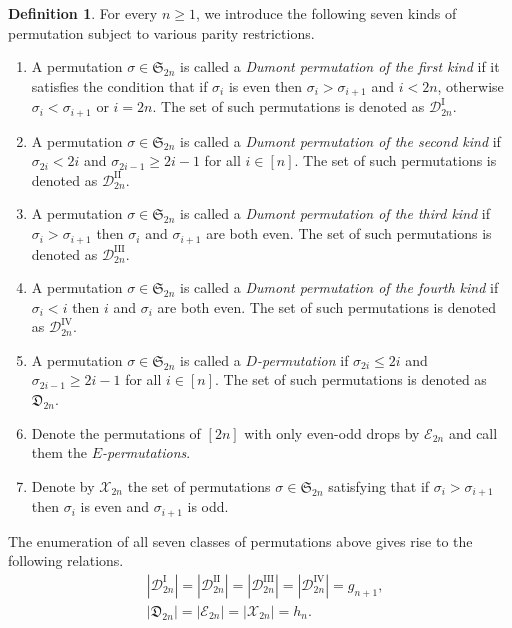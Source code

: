 \documentclass[11pt,reqno]{amsart}
\numberwithin{equation}{section}
\theoremstyle{plain}
\theoremstyle{definition}
\newtheorem{Def}[theorem]{Definition}
\newcommand{\D}{\mathcal{D}}
\newcommand{\cE}{\mathcal{E}}
\newcommand{\fD}{\mathfrak{D}}
\renewcommand{\S}{\mathfrak{S}}
\newcommand{\cX}{\mathcal{X}}
\begin{document}
\begin{Def}\label{def:five perm}
For every $n\ge 1$, we introduce the following seven kinds of permutation subject to various parity restrictions.
    \begin{enumerate}
        \item A permutation $\sigma\in\S_{2n}$ is called a {\it Dumont permutation of the first kind} if it satisfies the condition that if $\sigma_i$ is even then $\sigma_i>\sigma_{i+1}$ and $i<2n$, otherwise $\sigma_i<\sigma_{i+1}$ or $i=2n$. The set of such permutations is denoted as $\D^{\mathrm{I}}_{2n}$.
        \item A permutation $\sigma\in\S_{2n}$ is called a {\it Dumont permutation of the second kind} if $\sigma_{2i}<2i$ and $\sigma_{2i-1}\ge 2i-1$ for all $i\in [n]$. The set of such permutations is denoted as $\D^{\mathrm{II}}_{2n}$.
        \item A permutation $\sigma\in\S_{2n}$ is called a {\it Dumont permutation of the third kind} if $\sigma_i>\sigma_{i+1}$ then $\sigma_i$ and $\sigma_{i+1}$ are both even. The set of such permutations is denoted as $\D^{\mathrm{III}}_{2n}$.
        \item A permutation $\sigma\in\S_{2n}$ is called a {\it Dumont permutation of the fourth kind} if $\sigma_i<i$ then $i$ and $\sigma_i$ are both even. The set of such permutations is denoted as $\D^{\mathrm{IV}}_{2n}$.
        \item A permutation $\sigma\in\S_{2n}$ is called a {\it $D$-permutation} if $\sigma_{2i}\le 2i$ and $\sigma_{2i-1}\ge 2i-1$ for all $i\in [n]$. The set of such permutations is denoted as $\fD_{2n}$.
        \item Denote the permutations of $[2n]$ with only even-odd drops by $\cE_{2n}$ and call them the {\it $E$-permutations}.
        \item Denote by $\cX_{2n}$ the set of permutations $\sigma\in\S_{2n}$ satisfying that if $\sigma_i>\sigma_{i+1}$ then $\sigma_i$ is even and $\sigma_{i+1}$ is odd.
    \end{enumerate}
\end{Def}
The enumeration of all seven classes of permutations above gives rise to the following relations.
\begin{align*}
&|\D^{\mathrm{I}}_{2n}|=|\D^{\mathrm{II}}_{2n}|=|\D^{\mathrm{III}}_{2n}|=|\D^{\mathrm{IV}}_{2n}|=g_{n+1},\\
&|\fD_{2n}|=|\cE_{2n}|=|\cX_{2n}|=h_n.
\end{align*}
\end{document}
